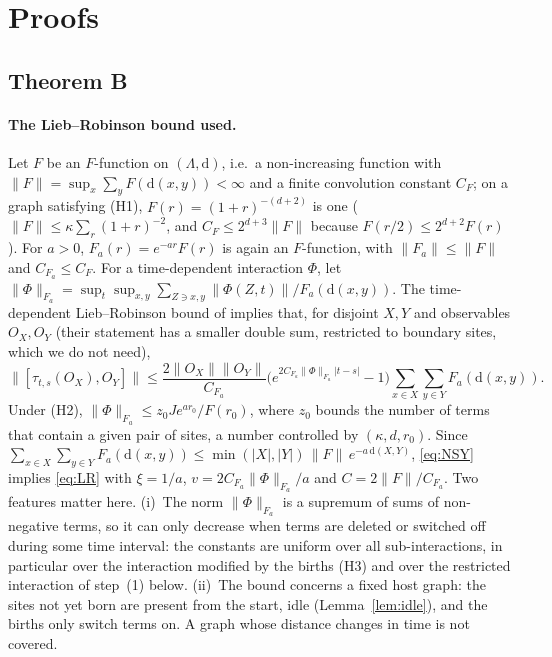 \section{Proofs}\label{app:proofs}

\subsection{Theorem B}\label{app:B}

\paragraph{The Lieb--Robinson bound used.} Let $F$ be an $F$-function on $(\Lambda,\mathrm d)$, i.e.\ a non-increasing function with $\|F\|=\sup_x\sum_yF(\mathrm d(x,y))<\infty$ and a finite convolution constant $C_F$; on a graph satisfying (H1), $F(r)=(1+r)^{-(d+2)}$ is one ($\|F\|\le\kappa\sum_r(1+r)^{-2}$, and $C_F\le2^{d+3}\|F\|$ because $F(r/2)\le2^{d+2}F(r)$). For $a>0$, $F_a(r)=e^{-ar}F(r)$ is again an $F$-function, with $\|F_a\|\le\|F\|$ and $C_{F_a}\le C_F$. For a time-dependent interaction $\Phi$, let $\|\Phi\|_{F_a}=\sup_t\sup_{x,y}\sum_{Z\ni x,y}\|\Phi(Z,t)\|/F_a(\mathrm d(x,y))$. The time-dependent Lieb--Robinson bound of \cite{NSY2019} implies that, for disjoint $X,Y$ and observables $O_X,O_Y$ (their statement has a smaller double sum, restricted to boundary sites, which we do not need),
\begin{equation}\label{eq:NSY}
\big\|[\tau_{t,s}(O_X),O_Y]\big\|\le\frac{2\|O_X\|\|O_Y\|}{C_{F_a}}\Big(e^{2C_{F_a}\|\Phi\|_{F_a}|t-s|}-1\Big)\sum_{x\in X}\sum_{y\in Y}F_a(\mathrm d(x,y)).
\end{equation}
Under (H2), $\|\Phi\|_{F_a}\le z_0Je^{ar_0}/F(r_0)$, where $z_0$ bounds the number of terms that contain a given pair of sites, a number controlled by $(\kappa,d,r_0)$. Since $\sum_{x\in X}\sum_{y\in Y}F_a(\mathrm d(x,y))\le\min(|X|,|Y|)\,\|F\|\,e^{-a\,\mathrm d(X,Y)}$, \eqref{eq:NSY} implies \eqref{eq:LR} with $\xi=1/a$, $v=2C_{F_a}\|\Phi\|_{F_a}/a$ and $C=2\|F\|/C_{F_a}$. Two features matter here. (i)~The norm $\|\Phi\|_{F_a}$ is a supremum of sums of non-negative terms, so it can only decrease when terms are deleted or switched off during some time interval: the constants are uniform over all sub-interactions, in particular over the interaction modified by the births (H3) and over the restricted interaction of step~(1) below. (ii)~The bound concerns a fixed host graph: the sites not yet born are present from the start, idle (Lemma~\ref{lem:idle}), and the births only switch terms on. A graph whose distance changes in time is not covered.

